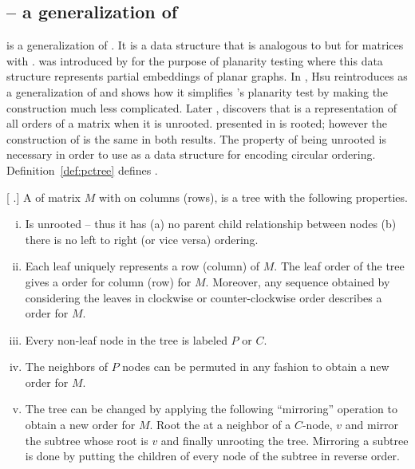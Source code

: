     
\subsection{\PCtree -- a generalization of \PQtree}

\PCtree is a generalization of \PQtree. It is a data structure that is
analogous to \PQtree but for matrices with \crop. \PCtree was
introduced by \cite{sh99} for the purpose of planarity testing where
this data structure represents partial embeddings of planar
graphs. %
In \cite{wlh01}, Hsu reintroduces \PCtree as a generalization of
\PQtree and shows how it simplifies \cite{bl76}'s planarity test by
making the \PQtree construction much less complicated. Later
\cite{hm03}, discovers that \PCtree is a representation of all \crop
orders of a matrix when it is unrooted. \PCtree presented in
\cite{wlh01} is rooted; however the construction of \PCtree is the
same in both results. The property of being unrooted is necessary in
order to use \PCtree as a data structure for encoding circular
ordering. Definition~\ref{def:pctree} defines \PCtree.

\begin{definition}
  \label{def:pctree}
  [\emph{\PCtree} \cite{wlh01,d08phd}.]  A \PCtree of matrix $M$ with
  \CROP on columns (rows), is a tree with the following properties.
  \begin{enumerate}[i.]
    \singlespacing
  \item Is unrooted -- thus it has (a) no parent child relationship
    between nodes (b) there is no left to right (or vice versa)
    ordering.
  \item Each leaf uniquely represents a row (column) of $M$. The leaf
    order of the tree gives a \CROP order for column (row) for
    $M$. Moreover, any sequence obtained by considering the leaves in
    clockwise or counter-clockwise order describes a \CROP order for
    $M$.
  \item Every non-leaf node in the tree is labeled $P$ or $C$.
  \item The neighbors of $P$ nodes can be permuted in any fashion to
    obtain a new \CROP order for $M$.
  \item \label{def::pcmirror} The tree can be changed by applying the following
    ``mirroring'' operation to obtain a new \CROP order for $M$. Root
    the \PCtree at a neighbor of a $C$-node, $v$ and mirror the
    subtree whose root is $v$ and finally unrooting the
    tree. Mirroring a subtree is done by putting the children of every
    node of the subtree in reverse order.
  \end{enumerate}
\end{definition}


